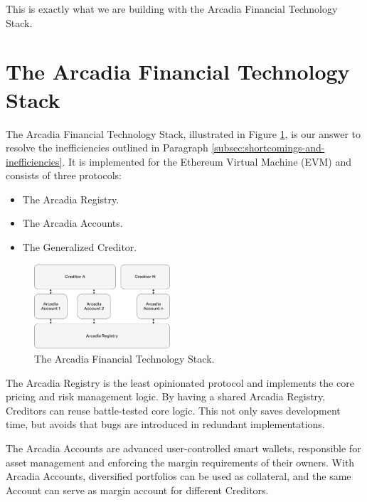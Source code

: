 \documentclass[sigconf,nonacm]{acmart}
\begin{document}
This is exactly what we are building with the Arcadia Financial Technology Stack.

\section{The Arcadia Financial Technology Stack}
\label{sec:arcadia-financial-technology-stack}

The Arcadia Financial Technology Stack, illustrated in Figure \ref{fig:arcadia-financial-technology-stack},
is our answer to resolve the inefficiencies outlined in Paragraph \ref{subsec:shortcomings-and-inefficiencies}.
It is implemented for the Ethereum Virtual Machine (EVM) and consists of three protocols:

\begin{samepage}
    \begin{itemize}
        \item The Arcadia Registry.
        \item The Arcadia Accounts.
        \item The Generalized Creditor.
    \end{itemize}
\end{samepage}

\begin{figure}
    \centering
    \includegraphics[width=0.45\textwidth]{images/Arcadia-Financial-Technology-Stack.png}
    \caption{The Arcadia Financial Technology Stack. \label{fig:arcadia-financial-technology-stack}}
\end{figure}

The Arcadia Registry is the least opinionated protocol and implements the core pricing and risk management logic.
By having a shared Arcadia Registry, Creditors can reuse battle-tested core logic.
This not only saves development time, but avoids that bugs are introduced in redundant implementations.

The Arcadia Accounts are advanced user-controlled smart wallets, responsible for asset management and enforcing the margin requirements of their owners.
With Arcadia Accounts, diversified portfolios can be used as collateral, and the same Account can serve as margin account for different Creditors.
\end{document}
